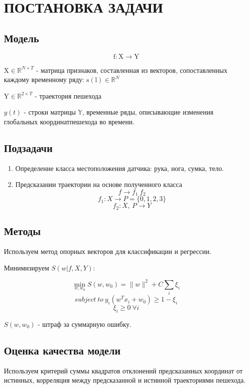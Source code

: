 \documentclass[letterpaper, 10 pt, conference]{ieeeconf}  %
\begin{document}
\section{ПОСТАНОВКА ЗАДАЧИ}

\subsection{Модель}

$$ \mathrm{f}  : \mathrm{X}   \rightarrow \mathrm{Y}$$

$\mathrm{X} \in \mathbb{R}^{N \times T} $ - матрица признаков, составленная из векторов, сопоставленных каждому временному ряду: $\mathrm{s(l)} \in \mathbb{R} ^ {N} $

$\mathrm{Y} \in \mathbb{R}^{2 \times T}$  - траектория пешехода

$y(t)  $ - строки матрицы $\mathbb{Y}$,  временные ряды, описывающие изменения глобальных координатпешехода во времени.

\subsection{Подзадачи}

\begin{enumerate}
\item Определение класса местоположения датчика: рука, нога, сумка, тело.
\item  Предсказании траектории на основе полученного класса\[f \to f_1 ~ f_2\]
\[f_1: X \to P = \{0, 1, 2, 3\}\]
\[f_2: X, ~P \to Y\]
\end{enumerate}

\subsection{Методы}

Используем метод опорных векторов для классификации и регрессии.

Минимизируем $S(w|f, X, Y)$:

\[\min_{w, w_0}S(w, w_0) = \|w\|^2+C\sum_{i}\xi_i\]
\[subject~to~y_i(w^Tx_i+w_0)\geq 1-\xi_i\]
\[\xi_i \geq 0~\forall i\] 

$S(w, w_0)$ - штраф за суммарную ошибку.

\subsection{Оценка качества модели}

Используем критерий суммы квадратов отклонений предсказанных координат от истинных, корреляция между предсказанной и истинной траекториями пешехода.
\end{document}
